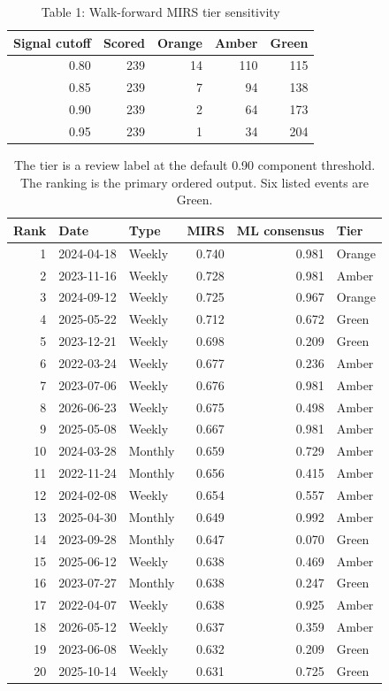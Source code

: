 \documentclass[11pt,a4paper]{article}
\begin{document}
\begin{table}[htbp]\centering\caption{Table 1: Walk-forward MIRS tier sensitivity}\small
\begin{tabular}{rrrrr}\toprule Signal cutoff & Scored & Orange & Amber & Green\\\midrule
0.80 & 239 & 14 & 110 & 115\\
0.85 & 239 & 7 & 94 & 138\\
0.90 & 239 & 2 & 64 & 173\\
0.95 & 239 & 1 & 34 & 204\\\bottomrule\end{tabular}\end{table}

\begin{table}[htbp]\centering\caption{Table 2: Top 20 expiries by walk-forward MIRS}\scriptsize
\begin{tabular}{rllrrl}\toprule Rank & Date & Type & MIRS & ML consensus & Tier\\\midrule
1 & 2024-04-18 & Weekly & 0.740 & 0.981 & Orange\\
2 & 2023-11-16 & Weekly & 0.728 & 0.981 & Amber\\
3 & 2024-09-12 & Weekly & 0.725 & 0.967 & Orange\\
4 & 2025-05-22 & Weekly & 0.712 & 0.672 & Green\\
5 & 2023-12-21 & Weekly & 0.698 & 0.209 & Green\\
6 & 2022-03-24 & Weekly & 0.677 & 0.236 & Amber\\
7 & 2023-07-06 & Weekly & 0.676 & 0.981 & Amber\\
8 & 2026-06-23 & Weekly & 0.675 & 0.498 & Amber\\
9 & 2025-05-08 & Weekly & 0.667 & 0.981 & Amber\\
10 & 2024-03-28 & Monthly & 0.659 & 0.729 & Amber\\
11 & 2022-11-24 & Monthly & 0.656 & 0.415 & Amber\\
12 & 2024-02-08 & Weekly & 0.654 & 0.557 & Amber\\
13 & 2025-04-30 & Monthly & 0.649 & 0.992 & Amber\\
14 & 2023-09-28 & Monthly & 0.647 & 0.070 & Green\\
15 & 2025-06-12 & Weekly & 0.638 & 0.469 & Amber\\
16 & 2023-07-27 & Monthly & 0.638 & 0.247 & Green\\
17 & 2022-04-07 & Weekly & 0.638 & 0.925 & Amber\\
18 & 2026-05-12 & Weekly & 0.637 & 0.359 & Amber\\
19 & 2023-06-08 & Weekly & 0.632 & 0.209 & Green\\
20 & 2025-10-14 & Weekly & 0.631 & 0.725 & Green\\\bottomrule\end{tabular}
\caption*{The tier is a review label at the default 0.90 component threshold. The ranking is the primary ordered output. Six listed events are Green.}\end{table}
\end{document}
